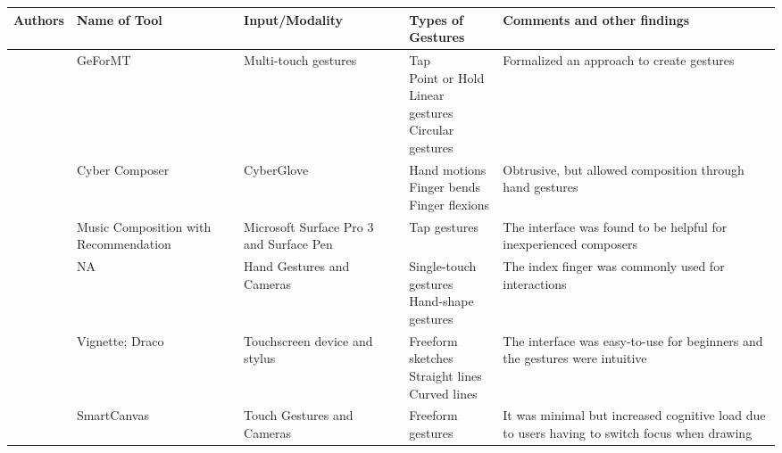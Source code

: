 \begin{landscape} %
\begin{table} [!htbp]  
\label{tab:rsogi}        
   \vspace{0.20cm}    
        \begin{tabular}{|p{3cm}|p{4cm}|p{4cm}| p{4cm}| p{5cm} | } %
        \hline 
       Authors & Name of Tool & Input/Modality & Types of Gestures & Comments and other findings \\ \hline
       
       \citet{kammer2010towards} & GeForMT & Multi-touch gestures & \makecell[tl]{Tap \\ Point or Hold \\ Linear gestures\\ Circular gestures} & Formalized an approach to create gestures \\ \hline
       
       
       \citet{ip2005cyber} & Cyber Composer & CyberGlove & \makecell[tl]{Hand motions \\ Finger bends \\ Finger flexions} & Obtrusive, but allowed composition through hand gestures \\ \hline
       
       \citet{kikuchi2016music} & Music Composition with Recommendation & Microsoft Surface Pro 3 and Surface Pen & Tap gestures & The interface was found to be helpful for inexperienced composers \\ \hline
       
       \citet{epps2006a} & NA & Hand Gestures and Cameras & \makecell[tl]{Single-touch gestures \\ Hand-shape gestures} & The index finger was commonly used for interactions \\ \hline
       
       \citet{kazi2012vignette,kazi2014draco} & Vignette; Draco & Touchscreen device and stylus & \makecell[tl]{Freeform sketches \\ Straight lines \\ Curved lines} & The interface was easy-to-use for beginners and the gestures were intuitive \\ \hline
       
       \citet{mo2005smartcanvas} & SmartCanvas & Touch Gestures and Cameras & Freeform gestures & It was minimal but increased cognitive load due to users having to switch focus when drawing \\ \hline 
       
        \end{tabular}
\end{table}
\end{landscape}

\newpage















